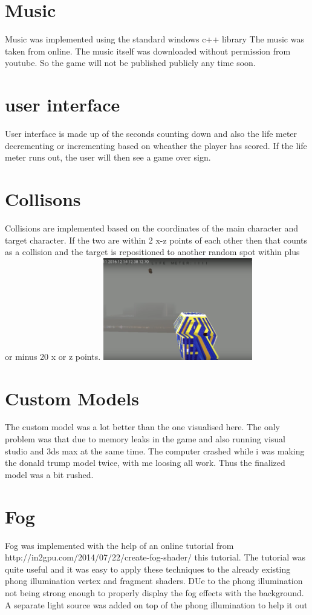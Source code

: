 \documentclass{article}
\begin{document}
\section{Music}

Music was implemented using the standard windows c++ library The music was taken from online. The music itself was downloaded without permission from youtube. So the game will not be published publicly any time soon.





\section{user interface}
User interface is made up of the seconds counting down and also the life meter decrementing or incrementing based on wheather the player has scored. If the life meter runs out, the user will then see a game over sign.


\section{Collisons}
Collisions are implemented based on the coordinates of the main character and target character. If the two are within 2 x-z points of each other then that counts as a collision and the target is repositioned to another random spot within plus or minus 20 x or z points.
\includegraphics[height=1.75in]{pic3.PNG}


\section{Custom Models}
The custom model was a lot better than the one visualised here. The only problem was that due to memory leaks in the game and also running visual studio and 3ds max at the same time. The computer crashed while i was making the donald trump model twice, with me loosing all work. Thus the finalized model was a bit rushed.


\section{Fog}
Fog was implemented with the help of an online tutorial from http://in2gpu.com/2014/07/22/create-fog-shader/ this tutorial. The tutorial was quite useful and it was easy to apply these techniques to the already existing phong illumination vertex and fragment shaders. DUe to the phong illumination not being strong enough to properly display the fog effects with the background. A separate light source was added on top of the phong illumination to help it out 
\end{document}

